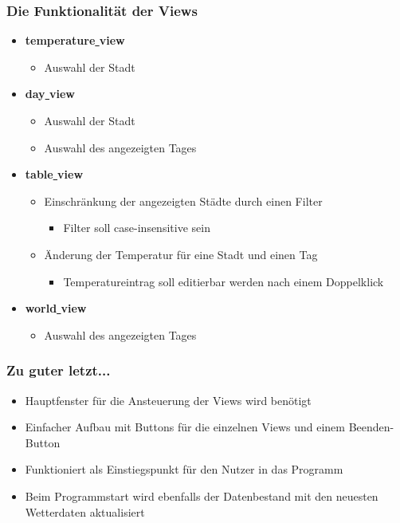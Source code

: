 \begin{frame}
  \frametitle{Die Funktionalit\"at der Views}
  \begin{itemize}
    \item \textbf{temperature\underline{ }view}
    \begin{itemize}
      \item Auswahl der Stadt
    \end{itemize}
    \item \textbf{day\underline{ }view}
    \begin{itemize}
      \item Auswahl der Stadt
      \item Auswahl des angezeigten Tages
    \end{itemize}
    \item \textbf{table\underline{ }view}
    \begin{itemize}
      \item Einschr\"ankung der angezeigten St\"adte durch einen Filter
      \begin{itemize}
        \item Filter soll case-insensitive sein
      \end{itemize}
      \item \"Anderung der Temperatur f\"ur eine Stadt und einen Tag
      \begin{itemize}
        \item Temperatureintrag soll editierbar werden nach einem Doppelklick
      \end{itemize}
    \end{itemize}
    \item \textbf{world\underline{ }view}
    \begin{itemize}
      \item Auswahl des angezeigten Tages
    \end{itemize}
  \end{itemize}
\end{frame}
\begin{frame}
  \frametitle{Zu guter letzt...}
  \begin{itemize}
    \item Hauptfenster f\"ur die Ansteuerung der Views wird ben\"otigt
    \item Einfacher Aufbau mit Buttons f\"ur die einzelnen Views und einem Beenden- Button
    \item Funktioniert als Einstiegspunkt f\"ur den Nutzer in das Programm
    \item Beim Programmstart wird ebenfalls der Datenbestand mit den neuesten Wetterdaten aktualisiert
  \end{itemize}
\end{frame}
